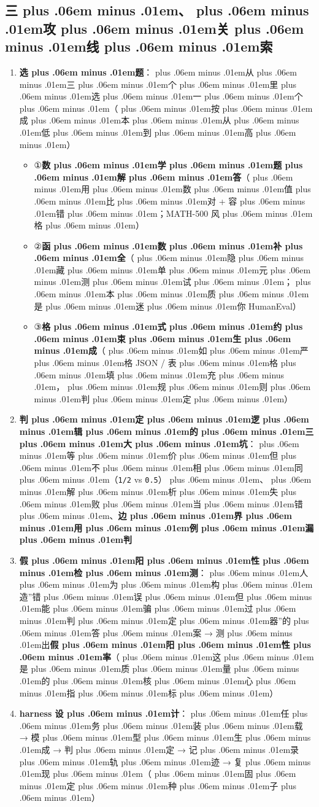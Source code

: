 \documentclass[
]{article}
\newcommand{\passthrough}[1]{#1}
\providecommand{\tightlist}{%
  \setlength{\itemsep}{0pt}\setlength{\parskip}{0pt}}
\def\zh#1{{\zhfont #1}}
\def\sym#1{{\symfont #1}}
\def\zhglue{\hskip0pt plus .06em minus .01em}
\begin{document}
\subsection{\zh{三\zhglue 、\zhglue 攻\zhglue 关\zhglue 线\zhglue 索}}\label{ux4e09ux653bux5173ux7ebfux7d22-7}

\begin{enumerate}
\def\labelenumi{\arabic{enumi}.}
\tightlist
\item
  \textbf{\zh{选\zhglue 题}}\zh{：\zhglue 从\zhglue 三\zhglue 个\zhglue 里\zhglue 选\zhglue 一\zhglue 个\zhglue （\zhglue 按\zhglue 成\zhglue 本\zhglue 从\zhglue 低\zhglue 到\zhglue 高\zhglue ）}

  \begin{itemize}
  \tightlist
  \item
    \sym{①}\textbf{\zh{数\zhglue 学\zhglue 题\zhglue 解\zhglue 答}}\zh{（\zhglue 用\zhglue 数\zhglue 值\zhglue 比\zhglue 对} + \zh{容\zhglue 错\zhglue ；}MATH-500 \zh{风\zhglue 格\zhglue ）}
  \item
    \sym{②}\textbf{\zh{函\zhglue 数\zhglue 补\zhglue 全}}\zh{（\zhglue 隐\zhglue 藏\zhglue 单\zhglue 元\zhglue 测\zhglue 试\zhglue ；\zhglue 本\zhglue 质\zhglue 是\zhglue 迷\zhglue 你} HumanEval\zh{）}
  \item
    \sym{③}\textbf{\zh{格\zhglue 式\zhglue 约\zhglue 束\zhglue 生\zhglue 成}}\zh{（\zhglue 如\zhglue 严\zhglue 格} JSON / \zh{表\zhglue 格\zhglue 填\zhglue 充\zhglue ，\zhglue 规\zhglue 则\zhglue 判\zhglue 定\zhglue ）}
  \end{itemize}
\item
  \textbf{\zh{判\zhglue 定\zhglue 逻\zhglue 辑\zhglue 的\zhglue 三\zhglue 大\zhglue 坑}}\zh{：\zhglue 等\zhglue 价\zhglue 但\zhglue 不\zhglue 相\zhglue 同\zhglue （}\passthrough{\lstinline!1/2!} vs \passthrough{\lstinline!0.5!}\zh{）\zhglue 、\zhglue 解\zhglue 析\zhglue 失\zhglue 败\zhglue 当\zhglue 错\zhglue 、}\textbf{\zh{边\zhglue 界\zhglue 用\zhglue 例\zhglue 漏\zhglue 判}}
\item
  \textbf{\zh{假\zhglue 阳\zhglue 性\zhglue 检\zhglue 测}}\zh{：\zhglue 人\zhglue 为\zhglue 构\zhglue 造}''\zh{错\zhglue 误\zhglue 但\zhglue 能\zhglue 骗\zhglue 过\zhglue 判\zhglue 定\zhglue 器}''\zh{的\zhglue 答\zhglue 案} \sym{→} \zh{测\zhglue 出}\textbf{\zh{假\zhglue 阳\zhglue 性\zhglue 率}}\zh{（\zhglue 这\zhglue 是\zhglue 质\zhglue 量\zhglue 的\zhglue 核\zhglue 心\zhglue 指\zhglue 标\zhglue ）}
\item
  \textbf{harness \zh{设\zhglue 计}}\zh{：\zhglue 任\zhglue 务\zhglue 装\zhglue 载} \sym{→} \zh{模\zhglue 型\zhglue 生\zhglue 成} \sym{→} \zh{判\zhglue 定} \sym{→} \zh{记\zhglue 录\zhglue 轨\zhglue 迹} \sym{→} \zh{复\zhglue 现\zhglue （\zhglue 固\zhglue 定\zhglue 种\zhglue 子\zhglue ）}

\end{enumerate}
\end{document}
